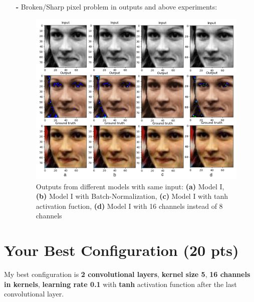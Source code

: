 \documentclass[12pt]{article}
\begin{document}
\begin{itemize}
	    \item[\textbf{-}] Broken/Sharp pixel problem in outputs and above experiments:
		    \begin{figure}[!h]
				\centering
				\includegraphics[width=1.0\textwidth]{p2_comparison.png}
				\caption{Outputs from different models with same input: \textbf{(a)} Model I, \textbf{(b)} Model I with Batch-Normalization, \textbf{(c)} Model I with tanh activation fuction, \textbf{(d)} Model I with 16 channels instead of 8 channels}
			\end{figure}
        
    \end{itemize}
\section{Your Best Configuration (20 pts)}
My best configuration is \textbf{2 convolutional layers}, \textbf{kernel size 5}, \textbf{16 channels in kernels}, \textbf{learning rate 0.1} with \textbf{tanh} activation function after the last convolutional layer.
 
\end{document}
